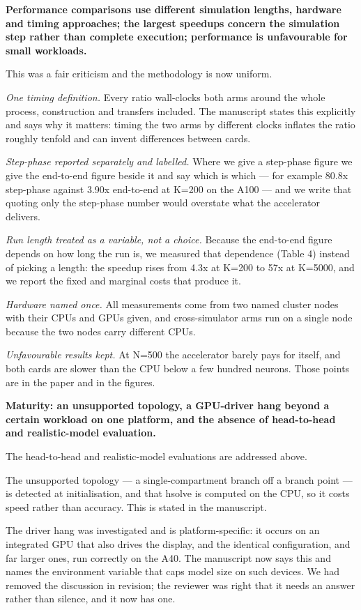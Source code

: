\documentclass[11pt,a4paper]{article}
\begin{document}
\textbf{Performance comparisons use different simulation lengths, hardware and timing approaches; the largest speedups concern the simulation step rather than complete execution; performance is unfavourable for small workloads.}

This was a fair criticism and the methodology is now uniform.

\emph{One timing definition.} Every ratio wall-clocks both arms around the whole process, construction and transfers included. The manuscript states this explicitly and says why it matters: timing the two arms by different clocks inflates the ratio roughly tenfold and can invent differences between cards.

\emph{Step-phase reported separately and labelled.} Where we give a step-phase figure we give the end-to-end figure beside it and say which is which --- for example 80.8x step-phase against 3.90x end-to-end at K=200 on the A100 --- and we write that quoting only the step-phase number would overstate what the accelerator delivers.

\emph{Run length treated as a variable, not a choice.} Because the end-to-end figure depends on how long the run is, we measured that dependence (Table 4) instead of picking a length: the speedup rises from 4.3x at K=200 to 57x at K=5000, and we report the fixed and marginal costs that produce it.

\emph{Hardware named once.} All measurements come from two named cluster nodes with their CPUs and GPUs given, and cross-simulator arms run on a single node because the two nodes carry different CPUs.

\emph{Unfavourable results kept.} At N=500 the accelerator barely pays for itself, and both cards are slower than the CPU below a few hundred neurons. Those points are in the paper and in the figures.

\textbf{Maturity: an unsupported topology, a GPU-driver hang beyond a certain workload on one platform, and the absence of head-to-head and realistic-model evaluation.}

The head-to-head and realistic-model evaluations are addressed above.

The unsupported topology --- a single-compartment branch off a branch point --- is detected at initialisation, and that hsolve is computed on the CPU, so it costs speed rather than accuracy. This is stated in the manuscript.

The driver hang was investigated and is platform-specific: it occurs on an integrated GPU that also drives the display, and the identical configuration, and far larger ones, run correctly on the A40. The manuscript now says this and names the environment variable that caps model size on such devices. We had removed the discussion in revision; the reviewer was right that it needs an answer rather than silence, and it now has one.
\end{document}
